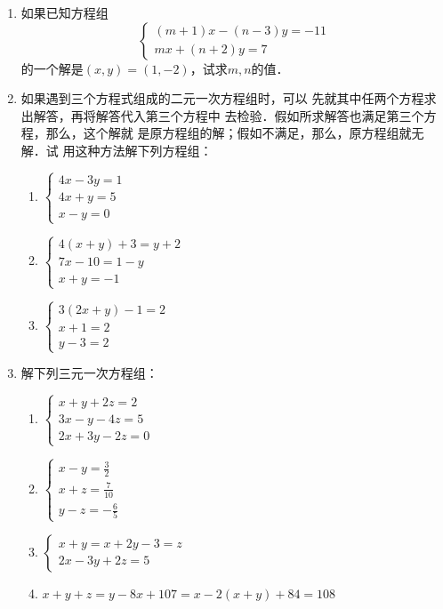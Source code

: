\begin{enumerate}
\item 如果已知方程组
\[\begin{cases}
  (m+1)x-(n-3)y  =-11\\
  mx+(n+2)y=7 
    \end{cases}\]
的一个解是$(x,y)=(1,-2)$，试求$m,n$的值．

\item 如果遇到三个方程式组成的二元一次方程组时，可以
先就其中任两个方程求出解答，再将解答代入第三个方程中
去检验．假如所求解答也满足第三个方程，那么，这个解就
是原方程组的解；假如不满足，那么，原方程组就无解．试
用这种方法解下列方程组：
\begin{multicols}{2}
    \begin{enumerate}
\item $\begin{cases}
4x-3y=1\\4x+y=5\\x-y=0
\end{cases}$
\item $\begin{cases}
4(x+y)+3=y+2\\ 7x-10=1-y\\ x+y=-1
\end{cases}$
\item $\begin{cases}
    3(2x+y)-1=2\\ x+1=2\\ y-3=2
    \end{cases}$
    \end{enumerate}
\end{multicols}

\item 解下列三元一次方程组：
    \begin{enumerate}
\item $\begin{cases}
    x+y+2z=2\\ 3x-y-4z=5\\ 2x+3y-2z=0
    \end{cases}$
\item $\begin{cases}
    x-y=\frac{3}{2}\\x+z=\frac{7}{10}\\y-z=-\frac{6}{5}
    \end{cases}$
    \item $\begin{cases}
    x+y=x+2y-3=z\\ 2x-3y+2z=5
    \end{cases}$
    \item $
    x+y+z=y-8x+107=x-2(x+y)+84=108$
    \end{enumerate}


\end{enumerate}
